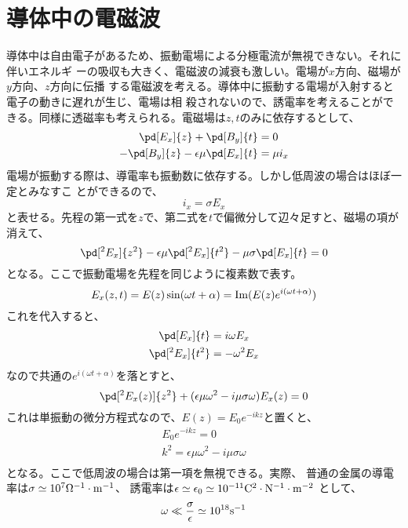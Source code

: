     \section{導体中の電磁波}
        導体中は自由電子があるため、振動電場による分極電流が無視できない。それに伴いエネルギ
        ーの吸収も大きく、電磁波の減衰も激しい。電場が$x$方向、磁場が$y$方向、$z$方向に伝播
        する電磁波を考える。導体中に振動する電場が入射すると電子の動きに遅れが生じ、電場は相
        殺されないので、誘電率を考えることができる。同様に透磁率も考えられる。電磁場は$z,t$のみに依存するとして、
        \begin{align*}
            \pd[E_x]{z} + \pd[B_y]{t} &= 0\\
            -\pd[B_y]{z} - \epsilon\mu\pd[E_x]{t} &= \mu i_x\\
        \end{align*}
        電場が振動する際は、導電率も振動数に依存する。しかし低周波の場合はほぼ一定とみなすこ
        とができるので、
            \[i_x = \sigma E_x\]
        と表せる。先程の第一式を$z$で、第二式を$t$で偏微分して辺々足すと、磁場の項が消えて、
            \[\pd[^2E_x]{z^2} - \epsilon\mu\pd[^2E_x]{t^2} - \mu\sigma\pd[E_x]{t} = 0\]
        となる。ここで振動電場を先程を同じように複素数で表す。
            \[E_x(z,t) = E(z)\sin(\omega t + \alpha) = {\rm Im}(E(z)e^{i(\omega t + \alpha)})\]
        これを代入すると、
        \begin{align*}
            \pd[E_x]{t} &= i\omega E_x\\
            \pd[^2E_x]{t^2} &= - \omega^2 E_x\\
        \end{align*}
        なので共通の$e^{i(\omega t + \alpha)}$を落とすと、
            \[\pd[^2E_x(z)]{z^2} + (\epsilon\mu\omega^2 - i\mu\sigma\omega)E_x(z) = 0\]
        これは単振動の微分方程式なので、$E(z) = E_0e^{-ikz}$と置くと、
        \begin{gather*}
            [- k^2 + (\epsilon\mu\omega^2 - i\mu\sigma\omega)]E_0e^{-ikz} = 0\\
            k^2 = \epsilon\mu\omega^2 - i\mu\sigma\omega\\
        \end{gather*}
        となる。ここで低周波の場合は第一項を無視できる。実際、
        普通の金属の導電率は$\sigma \simeq 10^7 {\rm \Omega^{-1}\cdot m^{-1}}$、
        誘電率は$\epsilon \simeq \epsilon_0 \simeq 10^{-11}{\rm C^2\cdot N^{-1}\cdot m^{-2}}$
        として、
            \[\omega \ll \frac{\sigma}{\epsilon} \simeq 10^{18}{\rm s^{-1}}\]
